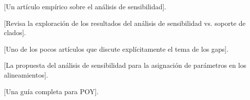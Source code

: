 \cite{Frost2001} [Un art\'iculo emp\'irico sobre el an\'alisis de sensibilidad].

\cite{Giribet2003} [Revisa la exploraci\'on de los resultados del an\'alisis de sensibilidad vs. soporte de clados].

\cite{Giribet1999} [Uno de los pocos art\'iculos que discute expl\'icitamente el tema de los gaps].

\cite{Wheeler1995} [La propuesta del an\'alisis de sensibilidad para la asignaci\'on de par\'ametros en los alineamientos].

\cite{Wheeleretal2006} [Una gu\'ia completa para POY].
